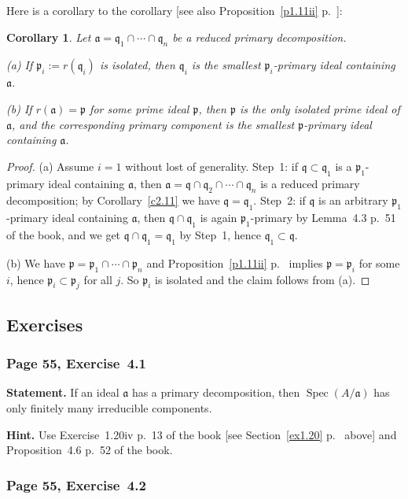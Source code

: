 \documentclass[12pt,letterpaper]{article}%
\newcommand{\mf}{\mathfrak}
\newcommand{\aaa}{\mf a}
\newcommand{\ppp}{\mf p}
\newcommand{\qqq}{\mf q}
\newcommand{\Spec}{\operatorname{Spec}}\newcommand{\Sp}{\operatorname{Spec}}
\newcommand{\nn}{\noindent}
\newtheorem{cor}[thm]{Corollary}
\begin{document}
Here is a corollary to the corollary [see also Proposition~\ref{p1.11ii} p.~\pageref{p1.11ii}]:

\begin{cor}\label{ctoc4.11}
Let $\aaa=\qqq_1\cap\cdots\cap\qqq_n$ be a reduced primary decomposition.

\nn\emph{(a)} If $\ppp_i:=r(\qqq_i)$ is isolated, then $\qqq_i$ is the smallest $\ppp_i$-primary ideal containing $\aaa$.

\nn\emph{(b)} If $r(\aaa)=\ppp$ for some prime ideal $\ppp$, then $\ppp$ is the only isolated prime ideal of $\aaa$, and the corresponding primary component is the smallest $\ppp$-primary ideal containing $\aaa$.
\end{cor}

\begin{proof}
(a) Assume $i=1$ without lost of generality. Step~1: if $\qqq\subset\qqq_1$ is a $\ppp_1$-primary ideal containing $\aaa$, then $\aaa=\qqq\cap\qqq_2\cap\cdots\cap\qqq_n$ is a reduced primary decomposition; by Corollary~\ref{c2.11} we have $\qqq=\qqq_1$. Step~2: if $\qqq$ is an arbitrary $\ppp_1$-primary ideal containing $\aaa$, then $\qqq\cap\qqq_1$ is again $\ppp_1$-primary by Lemma~4.3 p.~51 of the book, and we get $\qqq\cap\qqq_1=\qqq_1$ by Step~1, hence $\qqq_1\subset\qqq$.

\nn(b) We have $\ppp=\ppp_1\cap\cdots\cap\ppp_n$ and Proposition~\ref{p1.11ii} p.~\pageref{p1.11ii} implies $\ppp=\ppp_i$ for some $i$, hence $\ppp_i\subset\ppp_j$ for all $j$. So $\ppp_i$ is isolated and the claim follows from (a).
\end{proof}

\subsection{Exercises}%

\subsubsection{Page 55, Exercise~4.1}%

\textbf{Statement.} If an ideal $\aaa$ has a primary decomposition, then $\Spec(A/\aaa)$ has only finitely many irreducible components.

\nn\textbf{Hint.} Use Exercise~1.20iv p.~13 of the book [see Section~\ref{ex1.20} p.~\pageref{ex1.20} above] and Proposition~4.6 p.~52 of the book. 

\subsubsection{Page 55, Exercise~4.2}%
\end{document}
